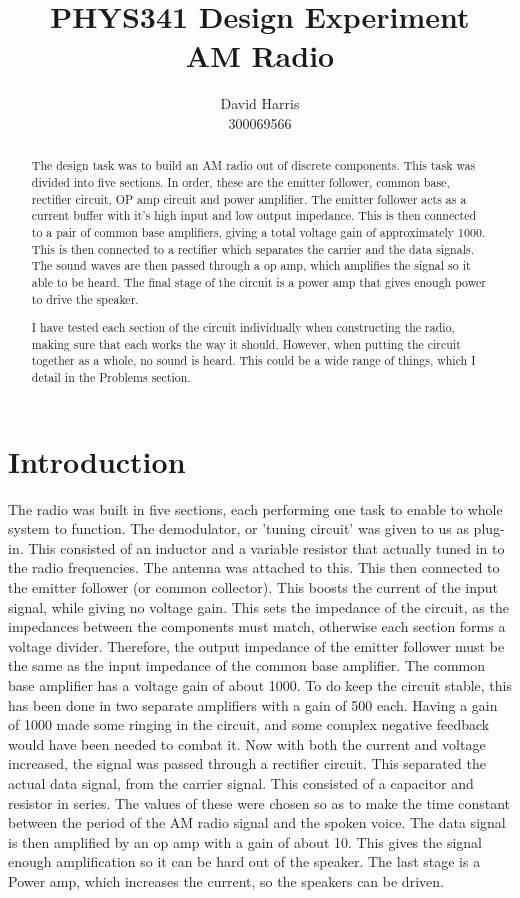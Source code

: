 \documentclass[a4paper,10pt]{report}
\title{PHYS341 Design Experiment \\ AM Radio}
\author{David Harris \\ 300069566}
\begin{document}
\maketitle
\tableofcontents
\begin{abstract}
  The design task was to build an AM radio out of discrete components.
  This task was divided into five sections.  In order, these are the
  emitter follower, common base, rectifier circuit, OP amp circuit and
  power amplifier.  The emitter follower acts as a current buffer with
  it's high input and low output impedance.  This is then connected to
  a pair of common base amplifiers, giving a total voltage gain of
  approximately 1000.  This is then connected to a rectifier which
  separates the carrier and the data signals.  The sound waves are
  then passed through a op amp, which amplifies the signal so it able
  to be heard.  The final stage of the circuit is a power amp that
  gives enough power to drive the speaker.

  I have tested each section of the circuit individually when
  constructing the radio, making sure that each works the way it
  should.  However, when putting the circuit together as a whole, no
  sound is heard.  This could be a wide range of things, which I
  detail in the Problems section.
\end{abstract}

\chapter{Introduction}
The radio was built in five sections, each performing one task to
enable to whole system to function.  The demodulator, or 'tuning
circuit' was given to us as plug-in.  This consisted of an inductor
and a variable resistor that actually tuned in to the radio
frequencies.  The antenna was attached to this.  This then connected
to the emitter follower (or common collector). This boosts the current
of the input signal, while giving no voltage gain.  This sets the
impedance of the circuit, as the impedances between the components
must match, otherwise each section forms a voltage divider.
Therefore, the output impedance of the emitter follower must be the
same as the input impedance of the common base amplifier.  The common
base amplifier has a voltage gain of about 1000.  To do keep the
circuit stable, this has been done in two separate amplifiers with a
gain of 500 each.  Having a gain of 1000 made some ringing in the
circuit, and some complex negative feedback would have been needed to
combat it.  Now with both the current and voltage increased, the
signal was passed through a rectifier circuit.  This separated the
actual data signal, from the carrier signal.  This consisted of a
capacitor and resistor in series.  The values of these were chosen so
as to make the time constant between the period of the AM radio signal
and the spoken voice.  The data signal is then amplified by an op amp
with a gain of about 10.  This gives the signal enough amplification
so it can be hard out of the speaker.  The last stage is a Power amp,
which increases the current, so the speakers can be driven.
\pagebreak
\end{document}
